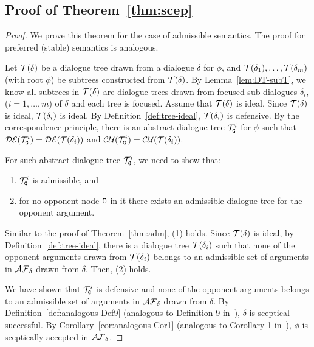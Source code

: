 \subsection{Proof of Theorem~\ref{thm:scep}}

\thmsceptical*

 \begin{proof} We prove this theorem for the case of admissible semantics. The proof for preferred (stable) semantics is analogous.
 
  Let $\mathcal{T}(\delta)$  be a dialogue tree drawn from a dialogue $\delta$ for $\phi$, and $\mathcal{T}(\delta_1), \ldots , \mathcal{T}(\delta_m)$ (with root $\phi$) be subtrees constructed from $\mathcal{T}(\delta)$. By Lemma~\ref{lem:DT-subT}, we know all subtrees in $\mathcal{T}(\delta)$ are dialogue trees drawn from focused sub-dialogues $\delta_i$, ($i = 1, \ldots , m$) of $\delta$ and each tree is focused. Assume that $\mathcal{T}(\delta)$ is ideal.   
  Since $\mathcal{T}(\delta)$ is ideal, $\mathcal{T}(\delta_i)$ is ideal. By Definition~\ref{def:tree-ideal}, $\mathcal{T}(\delta_i)$ is defensive.
  By the correspondence principle, there is an abstract dialogue tree $\mathcal{T}_{\texttt{\textup{G}}}^{i}$ for $\phi$ such that $\mathcal{DE}(\mathcal{T}_{\texttt{\textup{G}}}^{i})  =  \mathcal{DE}(\mathcal{T}(\delta_i))$ and $ \mathcal{CU}(\mathcal{T}_{\texttt{\textup{G}}}^{i})  =  \mathcal{CU}(\mathcal{T}(\delta_ i))$.

  
  For such abstract dialogue tree $\mathcal{T}_{\texttt{\textup{G}}}^{i}$, we need to show that:
  \begin{enumerate}
      \item $\mathcal{T}_{\texttt{\textup{G}}}^{i}$ is admissible, and
      \item for no opponent node $\texttt{\textup{O}}$ in it there exists an admissible dialogue tree for the opponent argument.
  \end{enumerate} 
  
  Similar to the proof of Theorem~\ref{thm:adm}, (1) holds.
%
  Since $\mathcal{T}(\delta)$ is ideal, by Definition~\ref{def:tree-ideal}, there is a dialogue tree $\mathcal{T}(\delta_i)$ such that none of the opponent arguments drawn from $\mathcal{T}(\delta_{i})$ belongs to an admissible set of arguments in $\mathcal{AF}_{\delta}$ drawn from $\delta$. Then, (2) holds.
  
  We have shown that $\mathcal{T}_{\texttt{\textup{G}}}^{i}$ is defensive and none of the opponent arguments belongs to an admissible set of arguments in $\mathcal{AF}_{\delta}$ drawn from $\delta$. By Definition~\ref{def:analogous-Def9} (analogous to Definition 9 in~\cite{loanho_2024}), $\delta$ is sceptical-successful. By Corollary~\ref{cor:analogous-Cor1} (analogous to Corollary 1 in~\cite{loanho_2024}), $\phi$ is sceptically accepted in $\mathcal{AF}_{\delta}$.
  \end{proof}


